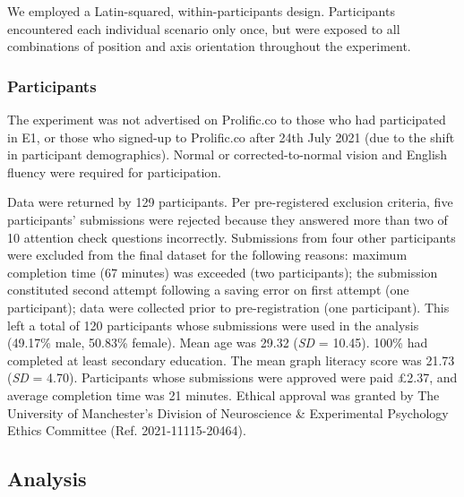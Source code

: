 \documentclass[journal]{vgtc}                %
\begin{document}
We employed a Latin-squared, within-participants design. Participants
encountered each individual scenario only once, but were exposed to all
combinations of position and axis orientation throughout the experiment.

\hypertarget{participants-1}{%
\subsubsection{Participants}\label{participants-1}}

The experiment was not advertised on Prolific.co to those who had
participated in E1, or those who signed-up to Prolific.co after 24th
July 2021 (due to the shift in participant demographics). Normal or
corrected-to-normal vision and English fluency were required for
participation.

Data were returned by 129 participants. Per pre-registered exclusion
criteria, five participants' submissions were rejected because they
answered more than two of 10 attention check questions incorrectly.
Submissions from four other participants were excluded from the final
dataset for the following reasons: maximum completion time (67 minutes)
was exceeded (two participants); the submission constituted second
attempt following a saving error on first attempt (one participant);
data were collected prior to pre-registration (one participant). This
left a total of 120 participants whose submissions were used in the
analysis (49.17\% male, 50.83\%
female). Mean age was 29.32 (\emph{SD} =
10.45). 100\% had
completed at least secondary education. The mean graph literacy score
was 21.73 (\emph{SD} =
4.70). Participants whose submissions were
approved were paid £2.37, and average completion time was
21 minutes. Ethical approval was
granted by The University of Manchester's Division of Neuroscience \&
Experimental Psychology Ethics Committee (Ref. 2021-11115-20464).

\hypertarget{analysis-1}{%
\subsection{Analysis}\label{analysis-1}}
\end{document}
